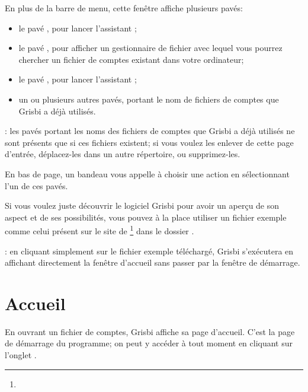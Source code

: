 En plus de la barre de menu, cette fenêtre affiche plusieurs pavés:

\begin{itemize}
	\item le pavé , pour lancer l'assistant ;
	\item le pavé , pour afficher un gestionnaire de fichier avec lequel vous pourrez chercher un fichier de comptes existant dans votre ordinateur;
	\item le pavé , pour lancer l'assistant ;
	\item un ou plusieurs autres pavés, portant le nom de fichiers de comptes que Grisbi a déjà utilisés.
\end{itemize}


\Note{}: les pavés portant les noms des fichiers de comptes que Grisbi a déjà utilisés ne sont présents que si ces fichiers existent; si vous voulez les enlever de cette page d'entrée, déplacez-les dans un autre répertoire, ou supprimez-les.


En bas de page, un bandeau vous appelle à choisir une action en sélectionnant l'un de ces pavés.


Si vous voulez juste découvrir le logiciel Grisbi pour avoir un aperçu de son aspect et de ses possibilités, vous pouvez à la place utiliser un fichier exemple comme celui présent sur le site de \footnote{\urlSourceForgeDocumentation{}} dans le dossier .		%


\Note{}: en cliquant simplement sur le fichier exemple téléchargé, Grisbi s'exécutera en affichant directement la fenêtre d'accueil sans passer par la fenêtre de démarrage.


\section{Accueil\label{home}}


En ouvrant un fichier de comptes, Grisbi affiche sa page d'accueil.
C'est la page de démarrage du programme; on peut y accéder à tout moment en cliquant sur l'onglet . 

